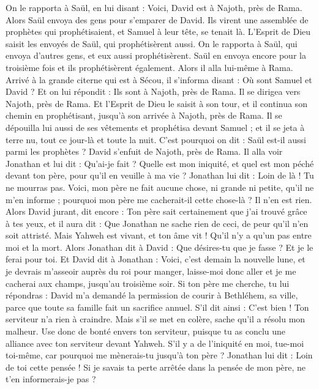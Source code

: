 \begin{multicols}{2}
On le rapporta à Saül, en lui disant : Voici, David est à Najoth, près de Rama.
Alors Saül envoya des gens pour s’emparer de David. Ils virent une assemblée de prophètes qui prophétisaient, et Samuel à leur tête, se tenait là. L'Esprit de Dieu saisit les envoyés de Saül, qui prophétisèrent aussi.
On le rapporta à Saül, qui envoya d'autres gens, et eux aussi prophétisèrent. Saül en envoya encore pour la troisième fois et ils prophétisèrent également.
Alors il alla lui-même à Rama. Arrivé à la grande citerne qui est à Sécou, il s'informa disant : Où sont Samuel et David ? Et on lui répondit : Ils sont à Najoth, près de Rama.
Il se dirigea vers Najoth, près de Rama. Et l'Esprit de Dieu le saisit à son tour, et il continua son chemin en prophétisant, jusqu'à son arrivée à Najoth, près de Rama.
Il se dépouilla lui aussi de ses vêtements et prophétisa devant Samuel ; et il se jeta à terre nu, tout ce jour-là et toute la nuit. C'est pourquoi on dit : Saül est-il aussi parmi les prophètes ?
\VerseOne{}David s'enfuit de Najoth, près de Rama. Il alla voir Jonathan et lui dit : Qu'ai-je fait ? Quelle est mon iniquité, et quel est mon péché devant ton père, pour qu'il en veuille à ma vie ?
Jonathan lui dit : Loin de là ! Tu ne mourras pas. Voici, mon père ne fait aucune chose, ni grande ni petite, qu'il ne m’en informe ; pourquoi mon père me cacherait-il cette chose-là ? Il n'en est rien.
Alors David jurant, dit encore : Ton père sait certainement que j’ai trouvé grâce à tes yeux, et il aura dit : Que Jonathan ne sache rien de ceci, de peur qu'il n'en soit attristé. Mais Yahweh est vivant, et ton âme vit ! Qu'il n'y a qu'un pas entre moi et la mort.
Alors Jonathan dit à David : Que désires-tu que je fasse ? Et je le ferai pour toi.
Et David dit à Jonathan : Voici, c'est demain la nouvelle lune, et je devrais m'asseoir auprès du roi pour manger, laisse-moi donc aller et je me cacherai aux champs, jusqu'au troisième soir.
Si ton père me cherche, tu lui répondras : David m'a demandé la permission de courir à Bethléhem, sa ville, parce que toute sa famille fait un sacrifice annuel.
S'il dit ainsi : C’est bien ! Ton serviteur n’a rien à craindre. Mais s'il se met en colère, sache qu’il a résolu mon malheur.
Use donc de bonté envers ton serviteur, puisque tu as conclu une alliance avec ton serviteur devant Yahweh. S'il y a de l’iniquité en moi, tue-moi toi-même, car pourquoi me mènerais-tu jusqu’à ton père ?
Jonathan lui dit : Loin de toi cette pensée ! Si je savais ta perte arrêtée dans la pensée de mon père, ne t’en informerais-je pas ?

\end{multicols}
